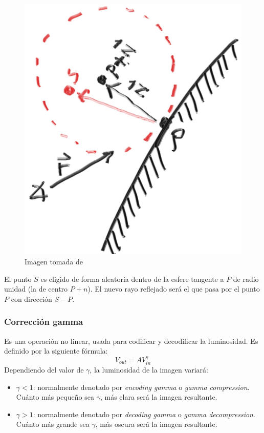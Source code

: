 \documentclass[12pt]{article}
\theoremstyle{definition}
\theoremstyle{remark}
\begin{document}
\begin{figure}[H]
   \center
  \includegraphics[scale=0.2]{diffuse_tangent.jpg}
  \caption{Imagen tomada de \cite{first_book}}
\end{figure}

El punto $S$ es eligido de forma aleatoria dentro de la esfere tangente a $P$ de radio unidad (la de centro $P+n$). El nuevo rayo reflejado será el que pasa por el punto $P$ con dirección $S-P$.

\subsubsection{Corrección gamma}

Es una operación no linear, usada para codificar y decodificar la luminosidad. Es definido por la siguiente fórmula:
\[
V_{out}=AV_{in}^\gamma
\]
Dependiendo del valor de $\gamma$, la luminosidad de la imagen variará:
\begin{itemize}
\item $\gamma < 1$: normalmente denotado por \textit{encoding gamma} o \textit{gamma compression}. Cuánto más pequeño sea $\gamma$, más clara será la imagen resultante.
\item $\gamma > 1$: normalmente denotado por \textit{decoding gamma} o \textit{gamma decompression}. Cuánto más grande sea $\gamma$, más oscura será la imagen resultante.
\end{itemize}
\end{document}
